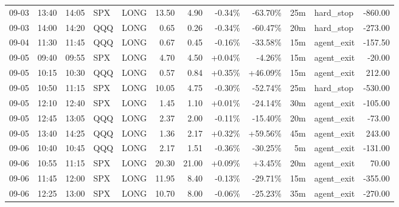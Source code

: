 \documentclass[11pt,a4paper]{article}
\begin{document}
\begin{center}
\begin{longtable}{>{\color{txtmain}}l l l l l r r r r r >{\color{txtmain}}l r}
09-03 & 13:40 & 14:05 & SPX & LONG & 13.50 & 4.90 & \textcolor{lossred}{-0.34\%} & \textcolor{lossred}{-63.70\%} & 25m & hard\_stop & \textcolor{lossred}{-860.00} \\
09-03 & 14:00 & 14:20 & QQQ & LONG & 0.65 & 0.26 & \textcolor{lossred}{-0.34\%} & \textcolor{lossred}{-60.47\%} & 20m & hard\_stop & \textcolor{lossred}{-273.00} \\
09-04 & 11:30 & 11:45 & QQQ & LONG & 0.67 & 0.45 & \textcolor{lossred}{-0.16\%} & \textcolor{lossred}{-33.58\%} & 15m & agent\_exit & \textcolor{lossred}{-157.50} \\
09-05 & 09:40 & 09:55 & SPX & LONG & 4.70 & 4.50 & \textcolor{wingreen}{+0.04\%} & \textcolor{lossred}{-4.26\%} & 15m & agent\_exit & \textcolor{lossred}{-20.00} \\
09-05 & 10:15 & 10:30 & QQQ & LONG & 0.57 & 0.84 & \textcolor{wingreen}{+0.35\%} & \textcolor{wingreen}{+46.09\%} & 15m & agent\_exit & \textcolor{wingreen}{212.00} \\
09-05 & 10:50 & 11:15 & SPX & LONG & 10.05 & 4.75 & \textcolor{lossred}{-0.30\%} & \textcolor{lossred}{-52.74\%} & 25m & hard\_stop & \textcolor{lossred}{-530.00} \\
09-05 & 12:10 & 12:40 & SPX & LONG & 1.45 & 1.10 & \textcolor{wingreen}{+0.01\%} & \textcolor{lossred}{-24.14\%} & 30m & agent\_exit & \textcolor{lossred}{-105.00} \\
09-05 & 12:45 & 13:05 & QQQ & LONG & 2.37 & 2.00 & \textcolor{lossred}{-0.11\%} & \textcolor{lossred}{-15.40\%} & 20m & agent\_exit & \textcolor{lossred}{-73.00} \\
09-05 & 13:40 & 14:25 & QQQ & LONG & 1.36 & 2.17 & \textcolor{wingreen}{+0.32\%} & \textcolor{wingreen}{+59.56\%} & 45m & agent\_exit & \textcolor{wingreen}{243.00} \\
09-06 & 10:40 & 10:45 & QQQ & LONG & 2.17 & 1.51 & \textcolor{lossred}{-0.36\%} & \textcolor{lossred}{-30.25\%} & 5m & agent\_exit & \textcolor{lossred}{-131.00} \\
09-06 & 10:55 & 11:15 & SPX & LONG & 20.30 & 21.00 & \textcolor{wingreen}{+0.09\%} & \textcolor{wingreen}{+3.45\%} & 20m & agent\_exit & \textcolor{wingreen}{70.00} \\
09-06 & 11:45 & 12:00 & SPX & LONG & 11.95 & 8.40 & \textcolor{lossred}{-0.13\%} & \textcolor{lossred}{-29.71\%} & 15m & agent\_exit & \textcolor{lossred}{-355.00} \\
09-06 & 12:25 & 13:00 & SPX & LONG & 10.70 & 8.00 & \textcolor{lossred}{-0.06\%} & \textcolor{lossred}{-25.23\%} & 35m & agent\_exit & \textcolor{lossred}{-270.00} \\

\end{longtable}
\end{center}
\end{document}

